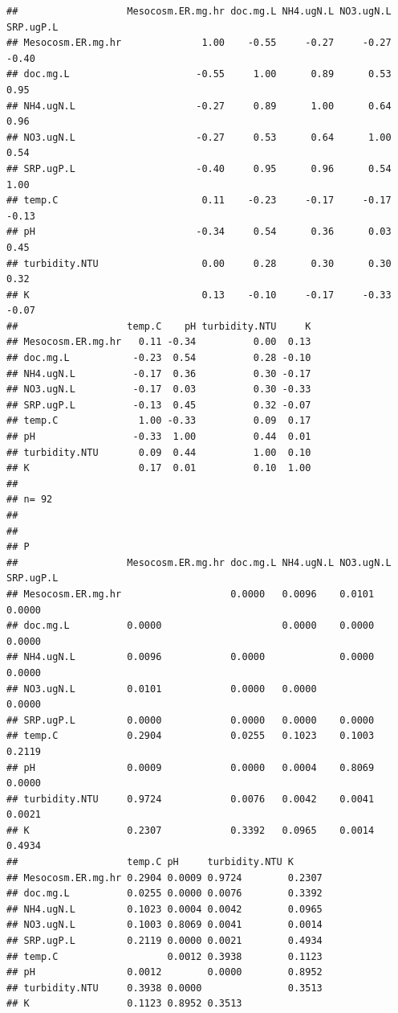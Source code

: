 \documentclass[
]{article}
\begin{document}
\begin{verbatim}
##                   Mesocosm.ER.mg.hr doc.mg.L NH4.ugN.L NO3.ugN.L SRP.ugP.L
## Mesocosm.ER.mg.hr              1.00    -0.55     -0.27     -0.27     -0.40
## doc.mg.L                      -0.55     1.00      0.89      0.53      0.95
## NH4.ugN.L                     -0.27     0.89      1.00      0.64      0.96
## NO3.ugN.L                     -0.27     0.53      0.64      1.00      0.54
## SRP.ugP.L                     -0.40     0.95      0.96      0.54      1.00
## temp.C                         0.11    -0.23     -0.17     -0.17     -0.13
## pH                            -0.34     0.54      0.36      0.03      0.45
## turbidity.NTU                  0.00     0.28      0.30      0.30      0.32
## K                              0.13    -0.10     -0.17     -0.33     -0.07
##                   temp.C    pH turbidity.NTU     K
## Mesocosm.ER.mg.hr   0.11 -0.34          0.00  0.13
## doc.mg.L           -0.23  0.54          0.28 -0.10
## NH4.ugN.L          -0.17  0.36          0.30 -0.17
## NO3.ugN.L          -0.17  0.03          0.30 -0.33
## SRP.ugP.L          -0.13  0.45          0.32 -0.07
## temp.C              1.00 -0.33          0.09  0.17
## pH                 -0.33  1.00          0.44  0.01
## turbidity.NTU       0.09  0.44          1.00  0.10
## K                   0.17  0.01          0.10  1.00
## 
## n= 92 
## 
## 
## P
##                   Mesocosm.ER.mg.hr doc.mg.L NH4.ugN.L NO3.ugN.L SRP.ugP.L
## Mesocosm.ER.mg.hr                   0.0000   0.0096    0.0101    0.0000   
## doc.mg.L          0.0000                     0.0000    0.0000    0.0000   
## NH4.ugN.L         0.0096            0.0000             0.0000    0.0000   
## NO3.ugN.L         0.0101            0.0000   0.0000              0.0000   
## SRP.ugP.L         0.0000            0.0000   0.0000    0.0000             
## temp.C            0.2904            0.0255   0.1023    0.1003    0.2119   
## pH                0.0009            0.0000   0.0004    0.8069    0.0000   
## turbidity.NTU     0.9724            0.0076   0.0042    0.0041    0.0021   
## K                 0.2307            0.3392   0.0965    0.0014    0.4934   
##                   temp.C pH     turbidity.NTU K     
## Mesocosm.ER.mg.hr 0.2904 0.0009 0.9724        0.2307
## doc.mg.L          0.0255 0.0000 0.0076        0.3392
## NH4.ugN.L         0.1023 0.0004 0.0042        0.0965
## NO3.ugN.L         0.1003 0.8069 0.0041        0.0014
## SRP.ugP.L         0.2119 0.0000 0.0021        0.4934
## temp.C                   0.0012 0.3938        0.1123
## pH                0.0012        0.0000        0.8952
## turbidity.NTU     0.3938 0.0000               0.3513
## K                 0.1123 0.8952 0.3513
\end{verbatim}
\end{document}
